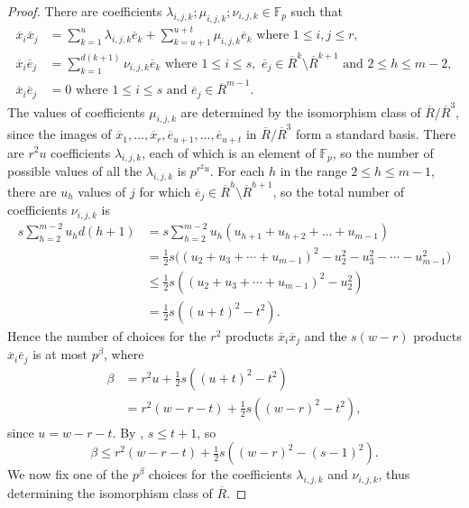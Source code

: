\documentclass[12pt]{article}
\begin{document}
\begin{proof}
There are coefficients $\lambda_{i,j,k}; \mu_{i,j,k}; \nu_{i,j,k} \in \mathbb{F}_{p}$ such that
\begin{align*}
\overline{x}_{i}\overline{x}_{j} & = \sum_{k=1}^{u}\lambda_{i,j,k}\overline{e}_{k} + \sum_{k=u+1}^{u+t}\mu_{i,j,k}\overline{e}_{k} \text{ where }1 \leq i, j \leq r,\\
\overline{x}_{i}\overline{e}_{j} & = \sum_{k=1}^{d(k+1)}\nu_{i,j,k}\overline{e}_{k} \text{ where } 1 \leq i \leq s,\,\,  \overline{e}_{j} \in \overline{R}^{k}\setminus\overline{R}^{k+1} \text{ and }2\leq h\leq m-2,\\
\overline{x}_{i}\overline{e}_{j} & = 0 \text{ where } 1 \leq i \leq s \text{ and } \overline{e}_{j} \in \overline{R}^{m-1}.
\end{align*}
The values of coefficients $\mu_{i,j,k}$ are determined by the isomorphism class of $\overline{R}/\overline{R}^3$, since the images of $\overline{x}_{1}, \ldots,  \overline{x}_{r},\overline{e}_{u+1}, \ldots, \overline{e}_{u+t}$ in $\overline{R}/\overline{R}^3$ form a standard basis. There are $r^{2}u$ coefficients $\lambda_{i,j,k}$, each of which is an element of $\mathbb{F}_{p}$, so the number of possible values of all the $\lambda_{i,j,k}$ is $p^{r^{2}u}$. For each $h$ in the range $2 \leq h \leq m - 1$, there are $u_{h}$ values of $j$ for which $\overline{e}_{j} \in \overline {R}^{h}\setminus\overline{R}^{h+1}$, so the total number of coefficients $\nu_{i,j,k}$ is
\begin{align*}
s\sum_{h=2}^{m-2}u_{h}d(h + 1) & =  s\sum_{h=2}^{m-2}u_{h}(u_{h+1} + u_{h+2} + \ldots + u_{m-1}) \\
{} & = \tfrac{1}{2}s\big((u_{2} + u_{3} + \cdots + u_{m-1})^{2} - u_{2}^{2} - u_{3}^{2} - \cdots - u_{m-1}^{2}\big)\\
&\leq \tfrac{1}{2}s\left((u_2+u_3+\cdots+u_{m-1})^2-u_2^2\right)\\
{} &= \tfrac{1}{2}s\left((u + t)^{2} - t^{2}\right).
\end{align*}
Hence the number of choices for the $r^{2}$ products $\overline{x}_{i}\overline{x}_{j}$ and the $s(w - r)$ products $\overline{x}_{i}\overline{e}_{j}$ is at most $p^{\beta}$, where 
\begin{align*}
\beta &= r^{2}u + \tfrac{1}{2}s\left((u + t)^{2} - t^{2}\right)\\
&=r^{2}(w - r - t) + \tfrac{1}{2}s\left((w - r)^{2} - t^{2}\right),
\end{align*}
since $u = w - r - t$. By \cite[Corollary 5.3]{K & P}, $s \leq t + 1$, so
\begin{equation} \label{beta}
\beta \leq  r^{2}(w - r - t) + \tfrac{1}{2}s\left((w - r)^{2} - (s - 1)^{2}\right).
\end{equation}
We now fix one of the $p^\beta$ choices for the coefficients $\lambda_{i,j,k}$ and $\nu_{i,j,k}$, thus determining the isomorphism class of $\overline{R}$.


\end{proof}
\end{document}
